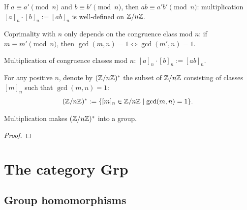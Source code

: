 \begin{lemma}
  \label{lem:groups:multiplication-well-defined}
  If $a \equiv a' \pmod{n}$ and $b \equiv b' \pmod{n}$, then
  $ab \equiv a'b' \pmod{n}$: multiplication $[a]_n \cdot [b]_n := [ab]_n$
  is well-defined on $\Z/n\Z$.
\end{lemma}

\begin{lemma}
  \label{lem:groups:coprime-class-well-defined}
  Coprimality with $n$ only depends on the congruence class mod $n$:
  if $m \equiv m' \pmod n$, then $\gcd(m,n) = 1 \iff \gcd(m',n) = 1$.
\end{lemma}

\begin{definition}[Multiplication on $\Z/n\Z$]
  \label{def:groups:zmod-mul}
  Multiplication of congruence classes mod $n$:
  $[a]_n \cdot [b]_n := [ab]_n$.
\end{definition}

\begin{definition}[$(\Z/n\Z)^*$]
  \label{def:groups:zmod-units}
  For any positive $n$, denote by $(\Z/n\Z)^*$ the subset of $\Z/n\Z$
  consisting of classes $[m]_n$ such that $\gcd(m,n)=1$:
  \[
    (\mathbb{Z}/n\mathbb{Z})^* := \{[m]_n \in \mathbb{Z}/n\mathbb{Z} \mid \gcd(m,n)=1\}.
  \]
\end{definition}

\begin{proposition}
  \label{prop:groups:units-group}
  Multiplication makes $(\Z/n\Z)^*$ into a group.
\end{proposition}
\begin{proof}
\end{proof}

\section{The category Grp}
\label{sec:groups:the-category-grp}

\subsection{Group homomorphisms}
\label{subsec:groups:group-homomorphisms}

